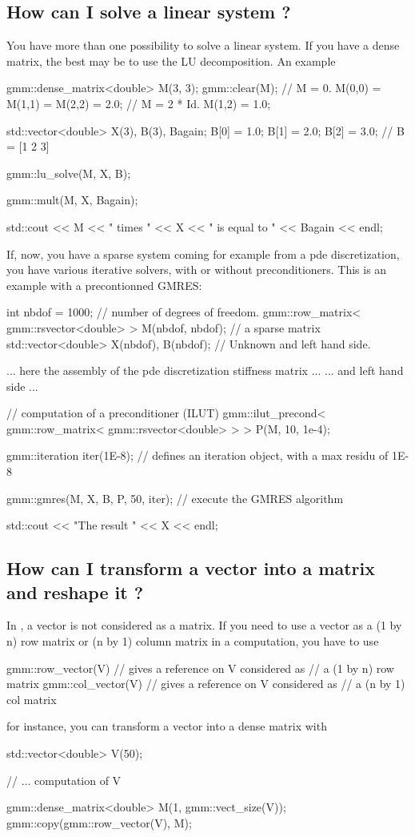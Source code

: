 \documentclass[11pt,a4paper]{article}
\begin{document}
\subsection{How can I solve a linear system ?}
You have more than one possibility to solve a linear system. If you have a dense matrix, the best may be to use the LU decomposition. An example
\begin{cppcode}
  gmm::dense_matrix<double> M(3, 3);
  gmm::clear(M);                  // M = 0.
  M(0,0) = M(1,1) = M(2,2) = 2.0; // M = 2 * Id.
  M(1,2) = 1.0;

  std::vector<double> X(3), B(3), Bagain;
  B[0] = 1.0; B[1] = 2.0; B[2] = 3.0;  // B = [1 2 3]
 
  gmm::lu_solve(M, X, B);

  gmm::mult(M, X, Bagain);

  std::cout << M << " times " << X << " is equal to " << Bagain << endl;
\end{cppcode}

If, now, you have a sparse system coming for example from a pde discretization, you have various iterative solvers, with or without preconditioners. This is an example with a precontionned GMRES:
 \begin{cppcode}
  int nbdof = 1000; // number of degrees of freedom.
  gmm::row_matrix< gmm::rsvector<double> > M(nbdof, nbdof); // a sparse matrix
  std::vector<double> X(nbdof), B(nbdof); // Unknown and left hand side.

  ... here the assembly of the pde discretization stiffness matrix ...
  ... and left hand side ...


  // computation of a preconditioner (ILUT)
  gmm::ilut_precond< gmm::row_matrix< gmm::rsvector<double> > > P(M, 10, 1e-4);

  gmm::iteration iter(1E-8);  // defines an iteration object, with a max residu of 1E-8

  gmm::gmres(M, X, B, P, 50, iter);  // execute the GMRES algorithm

  std::cout << "The result " << X << endl;
\end{cppcode}

\subsection{How can I transform a vector into a matrix and reshape it ?}
In \gmm, a vector is not considered as a matrix. If you need to use a vector as a (1 by n) row matrix or (n by 1) column matrix in a computation, you have to use
\begin{cppcode}
   gmm::row_vector(V) // gives a reference on V considered as
                      // a (1 by n) row matrix
   gmm::col_vector(V) // gives a reference on V considered as
                      // a (n by 1) col matrix
\end{cppcode}
for instance, you can transform a vector into a dense matrix with
\begin{cppcode}
  std::vector<double> V(50);

  // ... computation of V

  gmm::dense_matrix<double> M(1, gmm::vect_size(V));
  gmm::copy(gmm::row_vector(V), M);
\end{cppcode}
\end{document}

